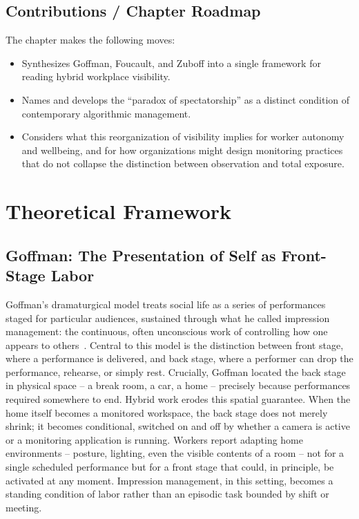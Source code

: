 \documentclass[11pt]{article}
\begin{document}
\subsection{Contributions / Chapter Roadmap}
The chapter makes the following moves:
\begin{itemize}
  \item Synthesizes Goffman, Foucault, and Zuboff into a single
        framework for reading hybrid workplace visibility.
  \item Names and develops the ``paradox of spectatorship'' as a
        distinct condition of contemporary algorithmic management.
  \item Considers what this reorganization of visibility implies for
        worker autonomy and wellbeing, and for how organizations
        might design monitoring practices that do not collapse the
        distinction between observation and total exposure.
\end{itemize}

\section{Theoretical Framework}
\label{sec:framework}

\subsection{Goffman: The Presentation of Self as Front-Stage Labor}

Goffman's dramaturgical model treats social life as a series of
performances staged for particular audiences, sustained through what
he called impression management: the continuous, often unconscious
work of controlling how one appears to others~\citep{goffman1959}.
Central to this model is the distinction between front stage, where
a performance is delivered, and back stage, where a performer can
drop the performance, rehearse, or simply rest. Crucially, Goffman
located the back stage in physical space -- a break room, a car, a
home -- precisely because performances required somewhere to end.
Hybrid work erodes this spatial guarantee. When the home itself
becomes a monitored workspace, the back stage does not merely shrink;
it becomes conditional, switched on and off by whether a camera is
active or a monitoring application is running. Workers report
adapting home environments -- posture, lighting, even the visible
contents of a room -- not for a single scheduled performance but for
a front stage that could, in principle, be activated at any moment.
Impression management, in this setting, becomes a standing
condition of labor rather than an episodic task bounded by shift or
meeting.
\end{document}
